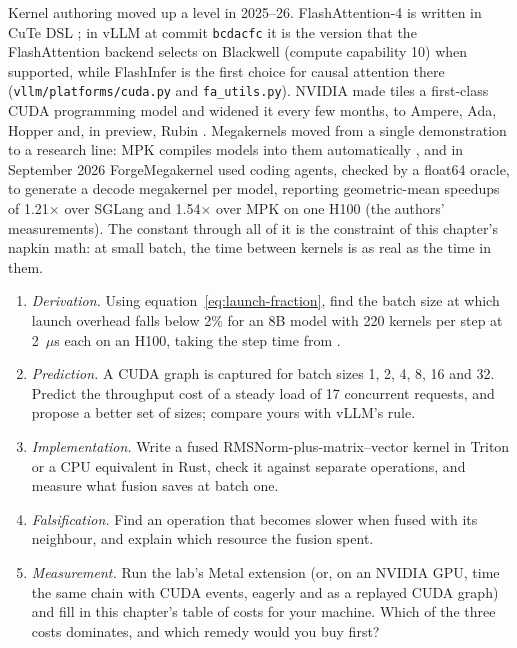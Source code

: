 Kernel authoring moved up a level in 2025--26. FlashAttention-4 is written in
CuTe DSL \cite{zadouri2026flashattention4}; in vLLM at commit \texttt{bcdacfc}
it is the version that the FlashAttention backend selects on Blackwell
(compute capability 10) when supported, while FlashInfer is the first choice
for causal attention there (\texttt{vllm/platforms/cuda.py} and
\texttt{fa\_utils.py}). NVIDIA made tiles a first-class CUDA programming model
and widened it every few months, to Ampere, Ada, Hopper and, in preview, Rubin
\cite{nvidia2026cudatile}. Megakernels moved from a single demonstration to a
research line: MPK compiles models into them automatically
\cite{cheng2025mpk}, and in September 2026 ForgeMegakernel used coding agents,
checked by a float64 oracle, to generate a decode megakernel per model,
reporting geometric-mean speedups of 1.21$\times$ over SGLang and 1.54$\times$
over MPK on one H100 \cite{li2026forgemegakernel} (the authors'
measurements). The constant through all of it is the constraint of this
chapter's napkin math: at small batch, the time between kernels is as real as
the time in them.

\ExercisesSection

\begin{enumerate}
\item \emph{Derivation.} Using equation~\eqref{eq:launch-fraction}, find the
batch size at which launch overhead falls below 2\% for an 8B model with 220
kernels per step at 2~$\mu$s each on an H100, taking the step time from
.
\item \emph{Prediction.} A CUDA graph is captured for batch sizes 1, 2, 4, 8,
16 and 32. Predict the throughput cost of a steady load of 17 concurrent
requests, and propose a better set of sizes; compare yours with vLLM's rule.
\item \emph{Implementation.} Write a fused RMSNorm-plus-matrix--vector kernel
in Triton or a CPU equivalent in Rust, check it against separate operations,
and measure what fusion saves at batch one.
\item \emph{Falsification.} Find an operation that becomes slower when fused
with its neighbour, and explain which resource the fusion spent.
\item \emph{Measurement.} Run the lab's Metal extension (or, on an NVIDIA GPU,
time the same chain with CUDA events, eagerly and as a replayed CUDA graph) and
fill in this chapter's table of costs for your machine. Which of the three costs
dominates, and which remedy would you buy first?
\end{enumerate}


